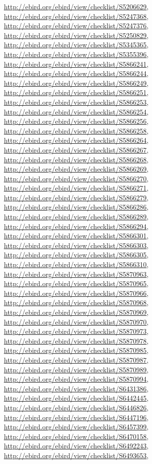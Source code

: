 \documentclass[9pt, article]{memoir}
\begin{document}
\begin{multicols}{2}
\url{http://ebird.org/ebird/view/checklist/S5206629}, 
\url{http://ebird.org/ebird/view/checklist/S5247368}, 
\url{http://ebird.org/ebird/view/checklist/S5247376}, 
\url{http://ebird.org/ebird/view/checklist/S5250829}, 
\url{http://ebird.org/ebird/view/checklist/S5345365}, 
\url{http://ebird.org/ebird/view/checklist/S5355396}, 
\url{http://ebird.org/ebird/view/checklist/S5866241}, 
\url{http://ebird.org/ebird/view/checklist/S5866244}, 
\url{http://ebird.org/ebird/view/checklist/S5866249}, 
\url{http://ebird.org/ebird/view/checklist/S5866251}, 
\url{http://ebird.org/ebird/view/checklist/S5866253}, 
\url{http://ebird.org/ebird/view/checklist/S5866254}, 
\url{http://ebird.org/ebird/view/checklist/S5866256}, 
\url{http://ebird.org/ebird/view/checklist/S5866258}, 
\url{http://ebird.org/ebird/view/checklist/S5866264}, 
\url{http://ebird.org/ebird/view/checklist/S5866267}, 
\url{http://ebird.org/ebird/view/checklist/S5866268}, 
\url{http://ebird.org/ebird/view/checklist/S5866269}, 
\url{http://ebird.org/ebird/view/checklist/S5866270}, 
\url{http://ebird.org/ebird/view/checklist/S5866271}, 
\url{http://ebird.org/ebird/view/checklist/S5866279}, 
\url{http://ebird.org/ebird/view/checklist/S5866286}, 
\url{http://ebird.org/ebird/view/checklist/S5866289}, 
\url{http://ebird.org/ebird/view/checklist/S5866294}, 
\url{http://ebird.org/ebird/view/checklist/S5866301}, 
\url{http://ebird.org/ebird/view/checklist/S5866303}, 
\url{http://ebird.org/ebird/view/checklist/S5866305}, 
\url{http://ebird.org/ebird/view/checklist/S5866310}, 
\url{http://ebird.org/ebird/view/checklist/S5870963}, 
\url{http://ebird.org/ebird/view/checklist/S5870965}, 
\url{http://ebird.org/ebird/view/checklist/S5870966}, 
\url{http://ebird.org/ebird/view/checklist/S5870968}, 
\url{http://ebird.org/ebird/view/checklist/S5870969}, 
\url{http://ebird.org/ebird/view/checklist/S5870970}, 
\url{http://ebird.org/ebird/view/checklist/S5870973}, 
\url{http://ebird.org/ebird/view/checklist/S5870978}, 
\url{http://ebird.org/ebird/view/checklist/S5870985}, 
\url{http://ebird.org/ebird/view/checklist/S5870987}, 
\url{http://ebird.org/ebird/view/checklist/S5870989}, 
\url{http://ebird.org/ebird/view/checklist/S5870994}, 
\url{http://ebird.org/ebird/view/checklist/S6431386}, 
\url{http://ebird.org/ebird/view/checklist/S6442445}, 
\url{http://ebird.org/ebird/view/checklist/S6446826}, 
\url{http://ebird.org/ebird/view/checklist/S6447196}, 
\url{http://ebird.org/ebird/view/checklist/S6457399}, 
\url{http://ebird.org/ebird/view/checklist/S6470158}, 
\url{http://ebird.org/ebird/view/checklist/S6492243}, 
\url{http://ebird.org/ebird/view/checklist/S6493653}, 

\end{multicols}
\end{document}
